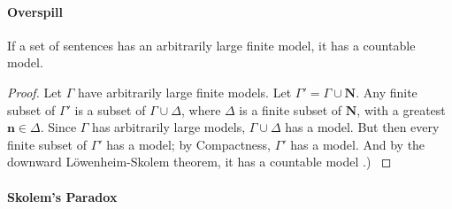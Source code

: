 % 
% 
% 
\paragraph{Overspill}

\begin{theorem}[Overspill]
	If a set of sentences has an arbitrarily large finite model, it has a countable model. \begin{proof}
		{Let $\Gamma$ have arbitrarily large finite models. Let $\Gamma' = \Gamma \cup \mathbf{N}$. Any finite subset of $\Gamma'$ is a subset of $\Gamma\cup\Delta$, where $\Delta$ is a finite subset of $\mathbf{N}$, with a greatest $\mathbf{n} \in \Delta$. Since $\Gamma$ has arbitrarily large models, $\Gamma\cup\Delta$ has a model. But then every finite subset of $\Gamma'$ has a model; by Compactness, $\Gamma'$ has a model. And by the downward L\"owenheim-Skolem theorem, it has a countable model \citep[147]{bbjcomlo}.)
		}
	\end{proof}
\end{theorem}

\paragraph{Skolem's Paradox}

